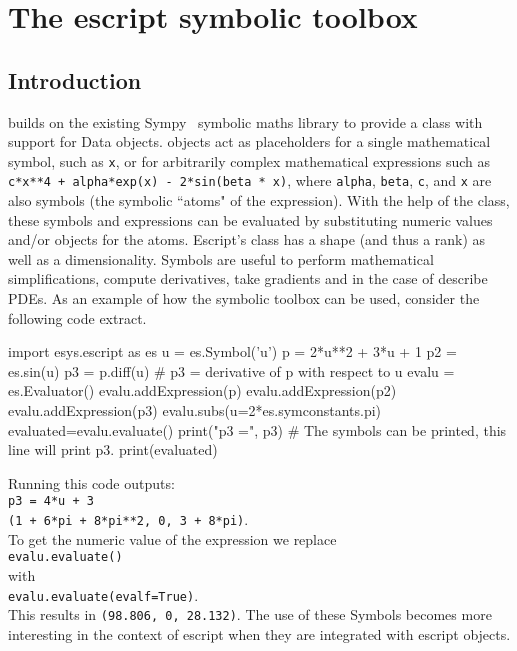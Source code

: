 
%
%
%

\chapter{The escript symbolic toolbox}
\label{CHAP:Symbolic}
\section{Introduction}
\escript builds on the existing Sympy~\cite{Sympy} symbolic maths library to
provide a \SYMBOL class with support for \escript Data objects. \SYMBOL objects
act as placeholders for a single mathematical symbol, such as \texttt{x}, or
for arbitrarily complex mathematical expressions such as
\texttt{c*x**4 + alpha*exp(x) - 2*sin(beta * x)}, where \texttt{alpha},
\texttt{beta}, \texttt{c}, and \texttt{x} are also symbols (the symbolic
``atoms" of the expression).
With the help of the \EVALUATOR class, these symbols and expressions can
be evaluated by substituting numeric values and/or \escript \Data objects
for the atoms. Escript's \SYMBOL class has a shape (and thus a rank) as well
as a dimensionality.
Symbols are useful to perform mathematical simplifications, compute
derivatives, take gradients and in the case of \escript describe PDEs.
As an example of how the symbolic toolbox can be used, consider the following
code extract.
\begin{python}
import esys.escript as es
u = es.Symbol('u')
p = 2*u**2 + 3*u + 1
p2 = es.sin(u)
p3 = p.diff(u)              # p3 = derivative of p with respect to u
evalu = es.Evaluator()
evalu.addExpression(p)
evalu.addExpression(p2)
evalu.addExpression(p3)
evalu.subs(u=2*es.symconstants.pi)
evaluated=evalu.evaluate()
print("p3 =", p3)            # The symbols can be printed, this line will print p3.
print(evaluated)
\end{python}
Running this code outputs:\\\texttt{p3 = 4*u + 3\\(1 + 6*pi + 8*pi**2, 0, 3 + 8*pi)}.\\
To get the numeric value of the expression we replace\\ 
\texttt{evalu.evaluate()}
\\with\\ 
\texttt{evalu.evaluate(evalf=True)}.\\
This results in
\texttt{(98.806, 0, 28.132)}.
The use of these Symbols becomes more interesting in the context of escript
when they are integrated with escript \Data objects.

